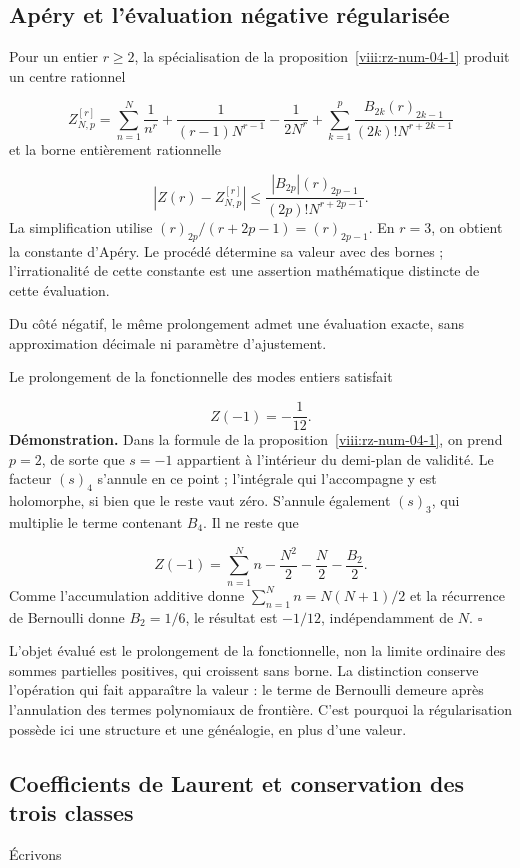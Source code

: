 \subsection{Apéry et l’évaluation négative régularisée}
Pour un entier \(r\geq2\), la spécialisation de la proposition~\ref{viii:rz-num-04-1} produit un centre rationnel

\[
Z_{N,p}^{[r]}=
\sum_{n=1}^N\frac1{n^r}+\frac1{(r-1)N^{r-1}}-\frac1{2N^r}
+\sum_{k=1}^p\frac{B_{2k}(r)_{2k-1}}{(2k)!N^{r+2k-1}}
\]
et la borne entièrement rationnelle

\[
\left|Z(r)-Z_{N,p}^{[r]}\right|
\leq\frac{|B_{2p}|(r)_{2p-1}}{(2p)!N^{r+2p-1}}.
\]
La simplification utilise \((r)_{2p}/(r+2p-1)=(r)_{2p-1}\). En \(r=3\), on obtient la constante d’Apéry. Le procédé détermine sa valeur avec des bornes ; l’irrationalité de cette constante est une assertion mathématique distincte de cette évaluation.

Du côté négatif, le même prolongement admet une évaluation exacte, sans approximation décimale ni paramètre d’ajustement.

Le prolongement de la fonctionnelle des modes entiers satisfait

\[
Z(-1)=-\frac1{12}.
\]
\textbf{Démonstration.} Dans la formule de la proposition~\ref{viii:rz-num-04-1}, on prend \(p=2\), de sorte que \(s=-1\) appartient à l'intérieur du demi-plan de validité. Le facteur \((s)_4\) s'annule en ce point ; l'intégrale qui l'accompagne y est holomorphe, si bien que le reste vaut zéro. S'annule également \((s)_3\), qui multiplie le terme contenant \(B_4\). Il ne reste que

\[
Z(-1)=\sum_{n=1}^N n-\frac{N^2}{2}-\frac N2-\frac{B_2}{2}.
\]
Comme l’accumulation additive donne \(\sum_{n=1}^N n=N(N+1)/2\) et la récurrence de Bernoulli donne \(B_2=1/6\), le résultat est \(-1/12\), indépendamment de \(N\). \hfill\(\square\)

L’objet évalué est le prolongement de la fonctionnelle, non la limite ordinaire des sommes partielles positives, qui croissent sans borne. La distinction conserve l’opération qui fait apparaître la valeur : le terme de Bernoulli demeure après l’annulation des termes polynomiaux de frontière. C’est pourquoi la régularisation possède ici une structure et une généalogie, en plus d’une valeur.

\subsection{Coefficients de Laurent et conservation des trois classes}
Écrivons

